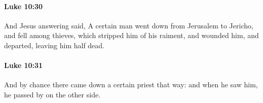 		\paragraph{Luke 10:30} %
			\label{LUKE-10-30}

			And Jesus answering said, A certain man went down from Jerusalem to Jericho, and fell among thieves, which stripped him of his raiment, and wounded him, and departed, leaving him half dead.

			\begin{framed}
			\scriptsize
				\begin{compactdesc}
					\item[SBLG] 
				\end{compactdesc}
			\end{framed}

		\paragraph{Luke 10:31} %
			\label{LUKE-10-31}

			And by chance there came down a certain priest that way: and when he saw him, he passed by on the other side.

